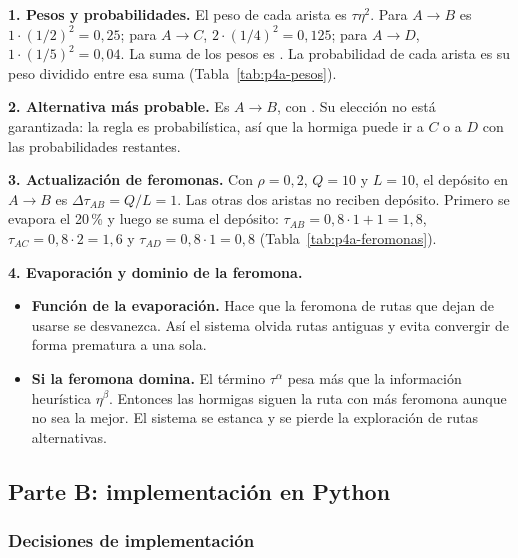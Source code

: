 \documentclass[12pt,a4paper]{article}
\begin{document}
\noindent\textbf{1. Pesos y probabilidades.} El peso de cada arista es
$\tau\eta^2$. Para $A\to B$ es $1\cdot(1/2)^2=0{,}25$; para $A\to C$,
$2\cdot(1/4)^2=0{,}125$; para $A\to D$, $1\cdot(1/5)^2=0{,}04$. La suma de
los pesos es \PcuatroSumaPesos{}. La probabilidad de cada arista es su peso
dividido entre esa suma (Tabla~\ref{tab:p4a-pesos}).



\noindent\textbf{2. Alternativa más probable.} Es $A\to B$, con
\PcuatroProbAPorc{}. Su elección no está garantizada: la regla es
probabilística, así que la hormiga puede ir a $C$ o a $D$ con las
probabilidades restantes.

\noindent\textbf{3. Actualización de feromonas.} Con $\rho=0{,}2$, $Q=10$ y
$L=10$, el depósito en $A\to B$ es $\Delta\tau_{AB}=Q/L=1$. Las otras dos
aristas no reciben depósito. Primero se evapora el 20\,\% y luego se suma
el depósito: $\tau_{AB}=0{,}8\cdot1+1=1{,}8$, $\tau_{AC}=0{,}8\cdot2=1{,}6$
y $\tau_{AD}=0{,}8\cdot1=0{,}8$ (Tabla~\ref{tab:p4a-feromonas}).



\noindent\textbf{4. Evaporación y dominio de la feromona.}
\begin{itemize}
  \item \textbf{Función de la evaporación.} Hace que la feromona de rutas
  que dejan de usarse se desvanezca. Así el sistema olvida rutas antiguas y
  evita convergir de forma prematura a una sola.
  \item \textbf{Si la feromona domina.} El término $\tau^\alpha$ pesa más
  que la información heurística $\eta^\beta$. Entonces las hormigas siguen la
  ruta con más feromona aunque no sea la mejor. El sistema se estanca y se
  pierde la exploración de rutas alternativas.
\end{itemize}

\subsection{Parte B: implementación en Python}

\subsubsection{Decisiones de implementación}
\end{document}
